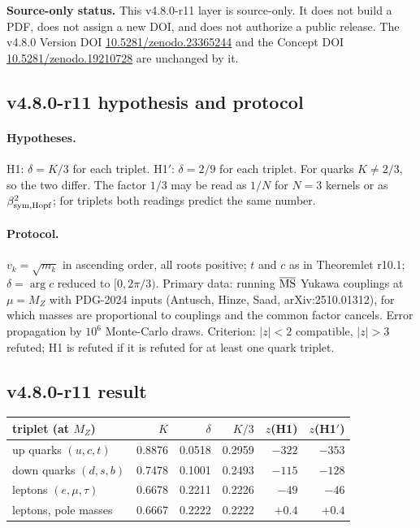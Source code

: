 \noindent\textbf{Source-only status.}
This v4.8.0-r11 layer is source-only.  It does not build a PDF, does not assign a new DOI,
and does not authorize a public release.  The v4.8.0 Version DOI
\href{https://doi.org/10.5281/zenodo.23365244}{10.5281/zenodo.23365244} and the Concept DOI
\href{https://doi.org/10.5281/zenodo.19210728}{10.5281/zenodo.19210728} are unchanged by it.

\subsection*{v4.8.0-r11 hypothesis and protocol}
\label{subsec:v480-r11-protocol}

\paragraph{Hypotheses.}
H1: \(\delta=K/3\) for each triplet.  H1\('\): \(\delta=2/9\) for each triplet.  For quarks
\(K\neq2/3\), so the two differ.  The factor \(1/3\) may be read as \(1/N\) for \(N=3\) kernels or as
\(\beta_{\rm sym,Hopf}^2\); for triplets both readings predict the same number.

\paragraph{Protocol.}
\(v_k=\sqrt{m_k}\) in ascending order, all roots positive; \(t\) and \(c\) as in Theoremlet r10.1;
\(\delta=\arg c\) reduced to \([0,2\pi/3)\).  Primary data: running \(\overline{\rm MS}\) Yukawa couplings
at \(\mu=M_Z\) with PDG-2024 inputs (Antusch, Hinze, Saad, arXiv:2510.01312), for which masses are
proportional to couplings and the common factor cancels.  Error propagation by \(10^6\) Monte-Carlo
draws.  Criterion: \(|z|<2\) compatible, \(|z|>3\) refuted; H1 is refuted if it is refuted for at least
one quark triplet.

\subsection*{v4.8.0-r11 result}
\label{subsec:v480-r11-result}

\begin{center}
\small
\begin{tabular}{@{}>{\raggedright\arraybackslash}p{}rrrrr@{}}
\toprule
triplet (at \(M_Z\)) & \(K\) & \(\delta\) & \(K/3\) & \(z\)(H1) & \(z\)(H1\('\))\\
\midrule
up quarks \((u,c,t)\) & 0.8876 & 0.0518 & 0.2959 & \(-322\) & \(-353\)\\
down quarks \((d,s,b)\) & 0.7478 & 0.1001 & 0.2493 & \(-115\) & \(-128\)\\
leptons \((e,\mu,\tau)\) & 0.6678 & 0.2211 & 0.2226 & \(-49\) & \(-46\)\\
leptons, pole masses & 0.6667 & 0.2222 & 0.2222 & \(+0.4\) & \(+0.4\)\\
\bottomrule
\end{tabular}
\end{center}

